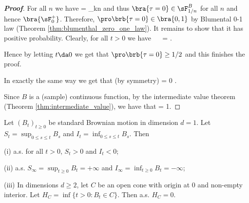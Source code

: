 \begin{proof}[\bf Proof]
For all $n$ we have
\be
{} = \bigcap_{k\geq n} 
\ee
and thus $\bra{\tau = 0} \in \sF^B_{1/n}$ for all $n$ and hence $\bra{\sF^+_0}$. Therefore, $\pro\brb{\tau = 0} \in \bra{0,1}$ by Blumental 0-1 law (Theorem \ref{thm:blumenthal_zero_one_law}). It remains to show that it has positive probability. Clearly, for all $t>0$ we have
\be
\pro{} \geq \pro{} \leq \pro{} \ \ra \ \pro{} \geq \pro{} = .
\ee

Hence by letting $t\da 0$ we get that $\pro\brb{\tau = 0} \geq 1/2$ and this finishes the proof.

In exactly the same way we get that (by symmetry)
\be
\inf{} = 0 .
\ee

Since $B$ is a (sample) continuous function, by the intermediate value theorem (Theorem \ref{thm:intermediate_value}), we have that
\be
\pro{} = 1.
\ee
\end{proof}


\begin{proposition}\label{pro:brownian_motion_limit_value}
Let $(B_t)_{t \geq 0}$ be standard Brownian motion in dimension $d = 1$. Let $S_t = \sup_{0\leq s \leq t} B_s$ and $I_t = \inf_{0\leq s\leq t} B_s$. Then
\ben
\item [(i)] a.s. for all $t > 0$, $S_t > 0$ and $I_t < 0$;
\item [(ii)] a.s. $S_\infty = \sup_{t\geq 0} B_t = +\infty$ and $I_\infty = \inf_{t\geq 0} B_t = -\infty$;
\item [(iii)] In dimensions $d \geq 2$, let $C$ be an open cone with origin at 0 and non-empty interior. Let $H_C = \inf\{t > 0: B_t \in C\}$. Then a.s. $H_C = 0$.
\een
\end{proposition}

